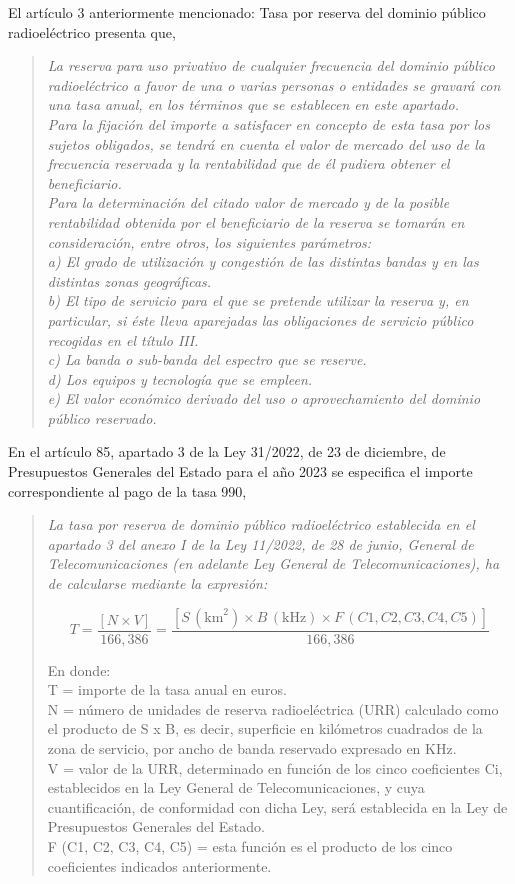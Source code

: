El artículo 3 anteriormente mencionado: Tasa por reserva del dominio público radioeléctrico presenta que,
\begin{quote}
\itshape
La reserva para uso privativo de cualquier frecuencia del dominio público radioeléctrico a favor de una o varias personas o entidades se gravará con una tasa anual, en los términos que se establecen en este apartado.\\
Para la fijación del importe a satisfacer en concepto de esta tasa por los sujetos obligados, se tendrá en cuenta el valor de mercado del uso de la frecuencia reservada y la rentabilidad que de él pudiera obtener el beneficiario.\\
Para la determinación del citado valor de mercado y de la posible rentabilidad obtenida por el beneficiario de la reserva se tomarán en consideración, entre otros, los siguientes parámetros:\\
a) El grado de utilización y congestión de las distintas bandas y en las distintas zonas geográficas.\\
b) El tipo de servicio para el que se pretende utilizar la reserva y, en particular, si éste lleva aparejadas las obligaciones de servicio público recogidas en el título III.\\
c) La banda o sub-banda del espectro que se reserve.\\
d) Los equipos y tecnología que se empleen.\\
e) El valor económico derivado del uso o aprovechamiento del dominio público reservado.
\end{quote}
En el artículo 85, apartado 3 de la Ley 31/2022, de 23 de diciembre, de Presupuestos Generales del Estado para el año 2023 se especifica el importe correspondiente al pago de la tasa 990, \\
\begin{quote}
\itshape
La tasa por reserva de dominio público radioeléctrico establecida en el apartado 3 del anexo I de la Ley 11/2022, de 28 de junio, General de Telecomunicaciones (en adelante Ley General de Telecomunicaciones), ha de calcularse mediante la expresión:

$$T = \frac{[N \times V]}{166,386} = \frac{[S \, (\text{km}^2) \times B \, (\text{kHz}) \times F \, (C1, C2, C3, C4, C5)]}{166,386}$$

En donde:\\
T = importe de la tasa anual en euros.\\
N = número de unidades de reserva radioeléctrica (URR) calculado como el producto de S x B, es decir, superficie en kilómetros cuadrados de la zona de servicio, por ancho de banda reservado expresado en KHz.\\
V = valor de la URR, determinado en función de los cinco coeficientes Ci, establecidos en la Ley General de Telecomunicaciones, y cuya cuantificación, de conformidad con dicha Ley, será establecida en la Ley de Presupuestos Generales del Estado.\\
F (C1, C2, C3, C4, C5) = esta función es el producto de los cinco coeficientes indicados anteriormente.
\end{quote}


